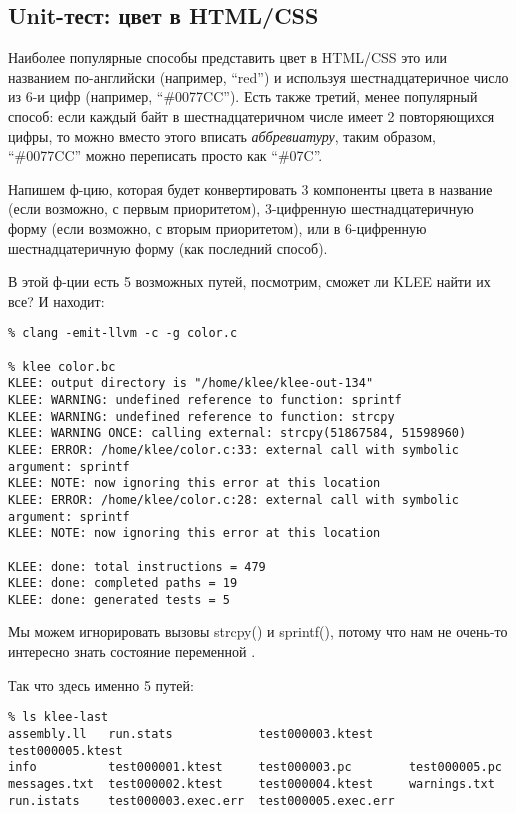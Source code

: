 \subsection{Unit-тест: цвет в HTML/CSS}

Наиболее популярные способы представить цвет в HTML/CSS это или названием по-английски (например, ``red'') и используя шестнадцатеричное число из 6-и цифр (например, ``\#0077CC'').
Есть также третий, менее популярный способ: если каждый байт в шестнадцатеричном числе имеет 2 повторяющихся цифры, то можно вместо этого вписать \textit{аббревиатуру}, таким образом, 
``\#0077CC'' можно переписать просто как ``\#07C''.

Напишем ф-цию, которая будет конвертировать 3 компоненты цвета в название (если возможно, с первым приоритетом), 3-цифренную шестнадцатеричную форму (если возможно, с вторым приоритетом),
или в 6-цифренную шестнадцатеричную форму (как последний способ).



В этой ф-ции есть 5 возможных путей, посмотрим, сможет ли KLEE найти их все?
И находит:

\begin{lstlisting}
% clang -emit-llvm -c -g color.c

% klee color.bc
KLEE: output directory is "/home/klee/klee-out-134"
KLEE: WARNING: undefined reference to function: sprintf
KLEE: WARNING: undefined reference to function: strcpy
KLEE: WARNING ONCE: calling external: strcpy(51867584, 51598960)
KLEE: ERROR: /home/klee/color.c:33: external call with symbolic argument: sprintf
KLEE: NOTE: now ignoring this error at this location
KLEE: ERROR: /home/klee/color.c:28: external call with symbolic argument: sprintf
KLEE: NOTE: now ignoring this error at this location

KLEE: done: total instructions = 479
KLEE: done: completed paths = 19
KLEE: done: generated tests = 5
\end{lstlisting}

Мы можем игнорировать вызовы strcpy() и sprintf(), потому что нам не очень-то интересно знать состояние переменной .

Так что здесь именно 5 путей:

\begin{lstlisting}
% ls klee-last
assembly.ll   run.stats            test000003.ktest     test000005.ktest
info          test000001.ktest     test000003.pc        test000005.pc
messages.txt  test000002.ktest     test000004.ktest     warnings.txt
run.istats    test000003.exec.err  test000005.exec.err
\end{lstlisting}

